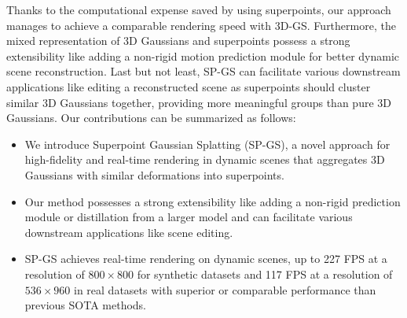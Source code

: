 Thanks to the computational expense saved by using superpoints, our approach manages to achieve a comparable rendering speed with 3D-GS. Furthermore, the mixed representation of 3D Gaussians and superpoints possess a strong extensibility like adding a non-rigid motion prediction module for better dynamic scene reconstruction. Last but not least, SP-GS can facilitate various downstream applications like editing a reconstructed scene as superpoints should cluster similar 3D Gaussians together, providing more meaningful groups than pure 3D Gaussians. 
Our contributions can be summarized as follows:
\begin{itemize}
  \item We introduce Superpoint Gaussian Splatting (SP-GS), a novel approach for high-fidelity and real-time rendering in dynamic scenes that aggregates 3D Gaussians with similar deformations into superpoints. 
  \item Our method possesses a strong extensibility like adding a non-rigid prediction module or distillation from a larger model and can facilitate various downstream applications like scene editing.
  \item SP-GS achieves real-time rendering on dynamic scenes, up to 227 FPS at a resolution of $800\times 800$ for synthetic datasets and 117 FPS at a resolution of $536 \times 960$ in real datasets with superior or comparable performance than previous SOTA methods.
\end{itemize}
